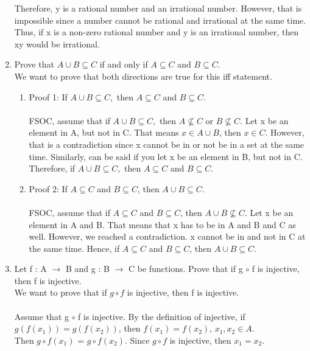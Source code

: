 \documentclass[12pt]{article}
\begin{document}
\begin{enumerate}
    Therefore, y is a rational number and an irrational number. However, that is impossible since a number cannot be rational and irrational at the same time. Thus, if x is a non-zero rational number and y is an irrational number, then xy would be irrational. \qedsymbol{}
    
    \item Prove that $A \cup B \subseteq C $ if and only if $A \subseteq C$ and $B \subseteq C$.\\

    We want to prove that both directions are true for this iff statement. \\
    
     \begin{enumerate}
         \item Proof 1: If $A \cup B \subseteq C,$ then $A \subseteq C$ and $B \subseteq C$. \\
         \\
         FSOC, assume that if $A \cup B \subseteq C,$ then $A \nsubseteq C$ or $B \nsubseteq C$. Let x be an element in A, but not in C. 
        That means $x \in A \cup B$, then $x \in C$. However, that is a contradiction since x cannot be in or not be in a set at the same time. 
        Similarly, can be said if you let x be an element in B, but not in C. 
        \\
        Therefore, if $A \cup B \subseteq C,$ then $A \subseteq C$ and $B \subseteq C$.
         \item Proof 2: If $A \subseteq C$ and $B \subseteq C$, then $A \cup B \subseteq C $.  \\
         \\FSOC, assume that if $A \subseteq C$ and $B \subseteq C$, then $A \cup B \nsubseteq C$. Let x be an element in A and B. That means that x has to be in A and B and C as well. However, we reached a contradiction. x cannot be in and not in C at the same time. Hence, if $A \subseteq C$ and $B \subseteq C$, then $A \cup B \subseteq C $.
            \\
         \qedsymbol{}
     \end{enumerate}
    
    \item Let f : A $\rightarrow$ B and g : B $\rightarrow$ C be functions. Prove that if g $\circ$ f is injective, then f is injective. \\

    We want to prove that if $g \circ f$ is injective, then f is injective. \\
    \\ Assume that g $\circ$ f is injective. By the definition of injective, if $g(f(x_1)) = g(f(x_2))$, then $f(x_1) = f(x_2)$, $x_1, x_2 \in A$. \\
    Then $g \circ f(x_1)$ = $g \circ f(x_2)$. Since $g \circ f$ is injective, then $x_1 = x_2$. 
    \qedsymbol{}


\end{enumerate}
\end{document}
